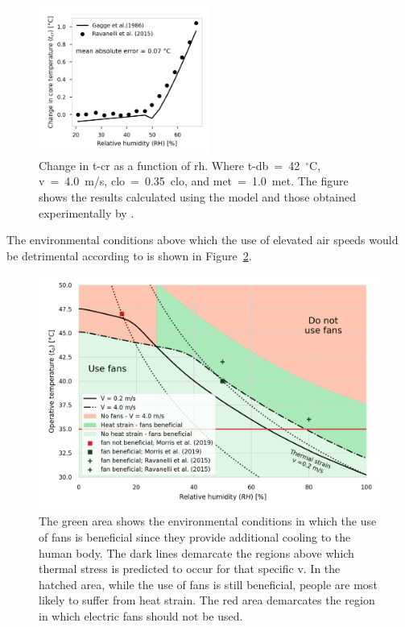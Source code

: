 \begin{figure}[thb!]
    \centering
    \includegraphics[width=0.5\textwidth]{figures/comparison_ravanelli}
    \caption{Change in \acf{t-cr} as a function of \acf{rh}.
    Where \ac{t-db}~=~42~$^{\circ}$C, \ac{v}~=~4.0~m/s, \ac{clo}~=~0.35~clo, and \ac{met}~=~1.0~met.
    The figure shows the results calculated using the  model and those obtained experimentally by .}
    \label{fig:comparison_ravanelli}
\end{figure}

The environmental conditions above which the use of elevated air speeds would be detrimental according to  is shown in Figure~\ref{fig:use_fans_experimental}.

\begin{figure}[thb!]
    \centering
    \includegraphics[width=\textwidth]{figures/summary_use_fans_comparison_experimental}
    \caption{The green area shows the environmental conditions in which the use of fans is beneficial since they provide additional cooling to the human body.
    The dark lines demarcate the regions above which thermal stress is predicted to occur for that specific \ac{v}.
    In the hatched area, while the use of fans is still beneficial, people are most likely to suffer from heat strain.
    The red area demarcates the region in which electric fans should not be used.
    }
    \label{fig:use_fans_experimental}
\end{figure}

